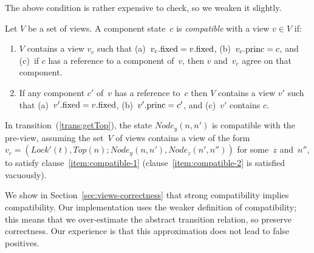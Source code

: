 
The above condition is rather expensive to check, so we weaken it slightly. 
%
\begin{definition}
\label{def:compatible}
Let $V$ be a set of views.  A component state~$c$ is \emph{compatible} with a
view $v \in V$ if:
%
\begin{enumerate}
\item\label{item:compatible-1} $V$ contains a view $v_c$ such that
  (a)~$v_c.\mathrm{fixed} = v.\mathrm{fixed}$, (b)~$v_c.\mathrm{princ} = c$, and (c)~if $c$ has a
  reference to a component of~$v$, then $v$ and~$v_c$ agree on that component.

\item\label{item:compatible-2} If any component $c'$ of~$v$ has a reference
  to~$c$ then $V$ contains a view $v'$ such that (a)~$v'.\mathrm{fixed} = v.\mathrm{fixed}$,
  (b)~$v'.\mathrm{princ} = c'$, and (c)~$v'$ contains $c$.
\end{enumerate}
\end{definition}

In transition~(\ref{trans:getTop}), the state $Node_y(n, n')$ is compatible
with the pre-view, assuming the set~$V$ of views contains a view of the form
$v_c = (Lock'(t), Top(n); Node_y(n, n'), Node_z(n', n''))$ for some~$z$
and~$n''$, to satisfy clause~\ref{item:compatible-1}
(clause~\ref{item:compatible-2} is satisfied vacuously).


We show in Section~\ref{sec:views-correctness} that strong compatibility
implies compatibility.  Our implementation uses the weaker definition of
compatibility; this means that we over-estimate the abstract transition
relation, so preserve correctness.  Our experience is that this approximation
does not lead to false positives.

